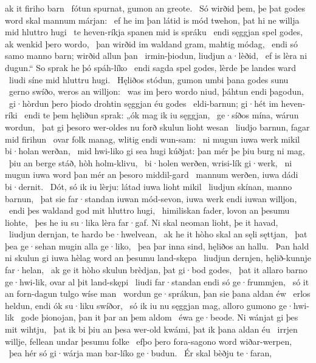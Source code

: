 ak it firiho barn \hld\ fótun spurnat,
gumon an greote. \hld\ Só wirðid þem, þe þat godes word skal
mannum márjan: \hld\ ef he im þan látid is mód twehon,
þat hi ne willja mid hluttro hugi \hld\ te heven-ríkja
spanen mid is spráku \hld\ endi sęggjan spel godes,
ak wenkid þero wordo, \hld\ þan wirðid im waldand gram,
mahtig módag, \hld\ endi só samo manno barn;
wirðid allun þan \hld\ irmin-þiodun,
liudjun a·lèðid, \hld\ ef is lèra ni dugun.“
So sprak he þó spáh-líko \hld\ endi sagda spel godes,
lèrde þe landes ward \hld\ liudi síne
mid hluttru hugi. \hld\ Hęliðos stódun,
gumon umbi þana godes sunu \hld\ gerno swíðo,
weros an willjon: \hld\ was im þero wordo niud,
þáhtun endi þagodun, \hld\ gi·hòrdun þero þiodo drohtin
sęggjan éu godes \hld\ eldi-barnun;
gi·hét im heven-ríki \hld\ endi te þem hęliðun sprak:
„ók mag ik iu sęggjan, \hld\ ge·síðos mína,
wárun wordun, \hld\ þat gi þesoro wer-oldes nu forð
skulun lioht wesan \hld\ liudjo barnun,
fagar mid firihun \hld\ ovar folk manag,
wlitig endi wun-sam: \hld\ ni mugun iuwa werk mikil
bi·holan werðan, \hld\ mid hwi-liko gi sea hugi kúðjat:
þan mér þe þiu burg ni mag, \hld\ þiu an berge stáð,
hòh holm-klivu, \hld\ bi·holen werðen,
wrisi-lík gi·werk, \hld\ ni mugun iuwa word þan mér
an þesoro middil-gard \hld\ mannum werðen,
iuwa dádi bi·dernit. \hld\ Dót, só ik iu lèrju:
látad iuwa lioht mikil \hld\ liudjun skínan,
manno barnun, \hld\ þat sie far·standan iuwan mód-sevon,
iuwa werk endi iuwan willjon, \hld\ endi þes waldand god
mit hluttro hugi, \hld\ himiliskan fader,
lovon an þesumu liohte, \hld\ þes he iu su·lika lèra far·gaf.
Ni skal neoman lioht, þe it havad, \hld\ liudjun dernjan,
te hardo be·hwelvean, \hld\ ak he it hòho skal
an sęli sęttjan, \hld\ þat þea ge·sehan mugin
alla ge·liko, \hld\ þea þar inna sind,
hęliðos an hallu. \hld\ Þan hald ni skulun gi iuwa hèlag word
an þesumu land-skępa \hld\ liudjun dernjen,
hęlið-kunnje far·helan, \hld\ ak ge it hòho skulun
brèdjan, þat gi·bod godes, \hld\ þat it allaro barno ge·hwi-lik,
ovar al þit land-skępi \hld\ liudi far·standan
endi só ge·frummjen, \hld\ só it an forn-dagun
tulgo wíse man \hld\ wordun ge·sprákun,
þan sie þana aldan éw \hld\ erlos heldun,
endi ók su·liku swíðor, \hld\ só ik iu nu sęggjan mag,
alloro gumono ge·hwi-lik \hld\ gode þionojan,
þan it þar an þem aldom \hld\ éwa ge·beode.
Ni wánjat gi þes mit wihtju, \hld\ þat ik bi þiu an þesa wer-old kwámi,
þat ik þana aldan éu \hld\ irrjen willje,
fellean undar þesumu folke \hld\ efþo þero fora-sagono
word wiðar-werpen, \hld\ þea hér só gi·wárja man
bar-líko ge·budun. \hld\ Ér skal bèðju te·faran,
